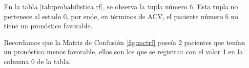 \begin{table}[H]
\centering
\setlength{\tabcolsep}{10pt}
\caption{Predicciones probabilísticas con clasificación final Random Forest}
\label{tab:probabilistica rf}
\end{table}
        
	En la tabla \ref{tab:probabilistica rf}, se observa la tupla número 6. Esta tupla no pertenece al estado 0, por ende, en términos de ACV, el paciente número 6 no tiene un pronóstico favorable. 
\par Recordamos que la Matriz de Confusión \ref{fig:mctrf} poseía 2 pacientes que tenían un pronóstico menos favorable, ellos son los que se registran con el valor 1 en la columna 0 de la tabla.

